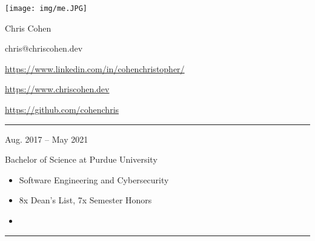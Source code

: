 \documentclass[a4paper]{article}
\newlength{\cvcolumngapwidth}
\newlength{\cvleftcolumnwidth}
\newlength{\cvrightcolumnwidth}
\newcommand{\cvnamestyle}[1]{{\Huge\cvnamefont\textcolor{cvnamecolor}{#1}}}
\newcommand{\cvsectionstyle}[1]{{\normalsize\cvsectionfont\textcolor{cvsectioncolor}{#1}}}
\newcommand{\cvtitlestyle}[1]{{\large\cvtitlefont\textcolor{cvtitlecolor}{#1}}}
\newcommand{\cvdurationstyle}[1]{{\small\cvdurationfont\textcolor{cvdurationcolor}{#1}}}
\newlength{\cvafteritemskipamount}
\newlength{\cvaftersectionskipamount}
\newlength{\cvbeforesectionskipamount}
\newlength{\cvafternameskipamount}
\newlength{\cvafterpersonalinfolineskipamount}
\newlength{\cvaftertitleskipamount}
\newlength{\cvparskip}
\newcommand{\cvpersonalinfo}[2]{
    \begin{minipage}[t]{\cvleftcolumnwidth}
        \vspace{0mm} %
        \raggedleft #1
    \end{minipage}%
    \hspace{\cvcolumngapwidth}%
    \begin{minipage}[t]{\cvrightcolumnwidth}
        \vspace{0mm} %
        #2
    \end{minipage}

    \vspace{\cvafteritemskipamount}
}
\newcommand{\cvname}[1]{
    \cvnamestyle{#1}

    \vspace{\cvafternameskipamount}
}
\newcommand{\cvpersonalinfolinewithicon}[3]{
    \raisebox{.5\fontcharht\font`E-.5\height}{\texttt{[image: \#2]}}
    #3

    \vspace{\cvafterpersonalinfolineskipamount}
}
\newcommand{\cvsection}[1]{
    \vspace{\cvbeforesectionskipamount}

    \begin{minipage}[t]{\cvleftcolumnwidth}
        \raggedleft\cvsectionstyle{#1}
    \end{minipage}%
    \hspace{\cvcolumngapwidth}%
    \begin{minipage}[t]{\cvrightcolumnwidth}
        \textcolor{cvrulecolor}{\rule{\cvrightcolumnwidth}{0.3mm}}
    \end{minipage}

    \vspace{\cvaftersectionskipamount}
}
\newcommand{\cvitem}[2]{
    \begin{minipage}[t]{\cvleftcolumnwidth}
        \raggedleft #1
    \end{minipage}%
    \hspace{\cvcolumngapwidth}%
    \begin{minipage}[t]{\cvrightcolumnwidth}
        \setlength{\parskip}{\cvparskip} #2
    \end{minipage}

    \vspace{\cvafteritemskipamount}
}
\newcommand{\cvtitle}[1]{
    \cvtitlestyle{#1}

    \vspace{\cvaftertitleskipamount}
    \vspace{-\cvparskip}
}
\begin{document}

\cvpersonalinfo{
    \texttt{[image: img/me.JPG]}
}{
    \cvname{\textcolor{emphasiscolor}{Chris Cohen}}


    \cvpersonalinfolinewithicon{height=4mm}{img/email.png}{
      chris@chriscohen.dev
    }

    \cvpersonalinfolinewithicon{height=4mm}{img/linkedin.png}{
      \href{https://www.linkedin.com/in/cohenchristopher/}{https://www.linkedin.com/in/cohenchristopher/}
    }

    \cvpersonalinfolinewithicon{height=4mm}{img/website.png}{
      \href{https://www.chriscohen.dev}{https://www.chriscohen.dev}
    }

    \cvpersonalinfolinewithicon{height=4mm}{img/github.png}{
      \href{https://github.com/cohenchris}{https://github.com/cohenchris}
    }
}


\cvsection{\LARGE \textcolor{emphasiscolor}{EDUCATION}}

\cvitem{
    \cvdurationstyle{Aug. 2017 -- May 2021}
}{
  \cvtitle{Bachelor of Science at Purdue University}


    \begin{itemize}[leftmargin=*]
      \item Software Engineering and Cybersecurity
      \item 8x Dean's List, 7x Semester Honors
      \item \large{\regularfont{\textcolor{emphasiscolor}{3.83 GPA}}}
    \end{itemize}
}


\cvsection{\LARGE \textcolor{emphasiscolor}{EXPERIENCE}}
\end{document}
